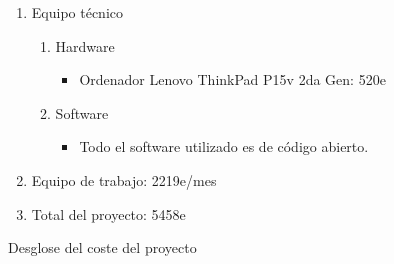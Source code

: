 \begin{figure}[H]
\begin{enumerate}
    \item Equipo técnico
    \begin{enumerate}
    \item Hardware
    \begin{itemize}
        \item Ordenador Lenovo ThinkPad P15v 2da Gen: 520e
    \end{itemize}
    \item Software
    \begin{itemize}
        \item Todo el software utilizado es de código abierto.
    \end{itemize}
    \end{enumerate}
    \item Equipo de trabajo: 2219e/mes
    \item Total del proyecto: 5458e
\end{enumerate}
\caption{Desglose del coste del proyecto}
\label{fig:desglose}
\end{figure}